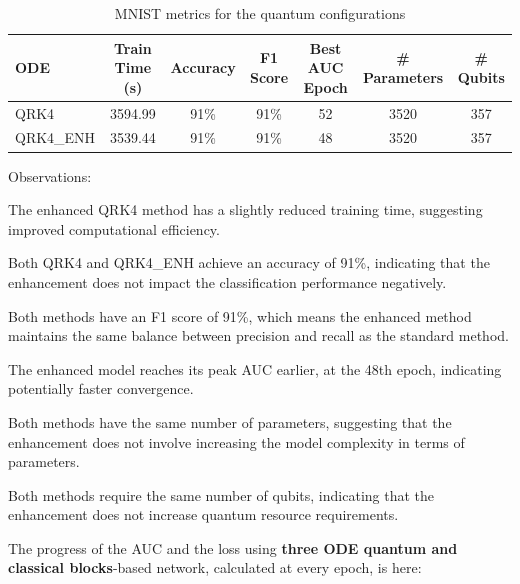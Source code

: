 \documentclass[12pt,a4paper]{report}
\begin{document}
\begin{table}[th]\small\linespread{1}
  \label{tab:classical_MNIST_3}
  \centering
  \begin{tabular}{|l|c|c|c|c|c|c|}
    \hline
    \textbf{ODE} & \textbf{Train Time (s)} & \textbf{Accuracy} & \textbf{F1 Score} & \textbf{Best AUC Epoch} & \textbf{\# Parameters} & \textbf{\# Qubits} \\
    \hline
    QRK4         & 3594.99                 & 91\%              & 91\%              & 52                      & 3520                   & 357                \\
    QRK4\_ENH    & 3539.44                 & 91\%              & 91\%              & 48                      & 3520                   & 357                \\
    \hline
  \end{tabular}
  \caption{MNIST metrics for the quantum configurations}
\end{table}

Observations:

The enhanced QRK4 method has a slightly reduced training time, suggesting improved computational efficiency.

Both QRK4 and QRK4\_ENH achieve an accuracy of 91\%, indicating that the enhancement does not impact the classification performance negatively.

Both methods have an F1 score of 91\%, which means the enhanced method maintains the same balance between precision and recall as the standard method.

The enhanced model reaches its peak AUC earlier, at the 48th epoch, indicating potentially faster convergence.

Both methods have the same number of parameters, suggesting that the enhancement does not involve increasing the model complexity in terms of parameters.

Both methods require the same number of qubits, indicating that the enhancement does not increase quantum resource requirements.

\clearpage
The progress of the AUC and the loss using \textbf{three ODE quantum and classical blocks}-based network, calculated at every epoch, is here:
\end{document}
